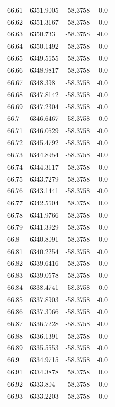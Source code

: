 \begin{table}[H]
\begin{tabular}{llll}
66.61 & 6351.9005 & -58.3758 & -0.0 \\
66.62 & 6351.3167 & -58.3758 & -0.0 \\
66.63 & 6350.733 & -58.3758 & -0.0 \\
66.64 & 6350.1492 & -58.3758 & -0.0 \\
66.65 & 6349.5655 & -58.3758 & -0.0 \\
66.66 & 6348.9817 & -58.3758 & -0.0 \\
66.67 & 6348.398 & -58.3758 & -0.0 \\
66.68 & 6347.8142 & -58.3758 & -0.0 \\
66.69 & 6347.2304 & -58.3758 & -0.0 \\
66.7 & 6346.6467 & -58.3758 & -0.0 \\
66.71 & 6346.0629 & -58.3758 & -0.0 \\
66.72 & 6345.4792 & -58.3758 & -0.0 \\
66.73 & 6344.8954 & -58.3758 & -0.0 \\
66.74 & 6344.3117 & -58.3758 & -0.0 \\
66.75 & 6343.7279 & -58.3758 & -0.0 \\
66.76 & 6343.1441 & -58.3758 & -0.0 \\
66.77 & 6342.5604 & -58.3758 & -0.0 \\
66.78 & 6341.9766 & -58.3758 & -0.0 \\
66.79 & 6341.3929 & -58.3758 & -0.0 \\
66.8 & 6340.8091 & -58.3758 & -0.0 \\
66.81 & 6340.2254 & -58.3758 & -0.0 \\
66.82 & 6339.6416 & -58.3758 & -0.0 \\
66.83 & 6339.0578 & -58.3758 & -0.0 \\
66.84 & 6338.4741 & -58.3758 & -0.0 \\
66.85 & 6337.8903 & -58.3758 & -0.0 \\
66.86 & 6337.3066 & -58.3758 & -0.0 \\
66.87 & 6336.7228 & -58.3758 & -0.0 \\
66.88 & 6336.1391 & -58.3758 & -0.0 \\
66.89 & 6335.5553 & -58.3758 & -0.0 \\
66.9 & 6334.9715 & -58.3758 & -0.0 \\
66.91 & 6334.3878 & -58.3758 & -0.0 \\
66.92 & 6333.804 & -58.3758 & -0.0 \\
66.93 & 6333.2203 & -58.3758 & -0.0 \\

\end{tabular}
\end{table}
